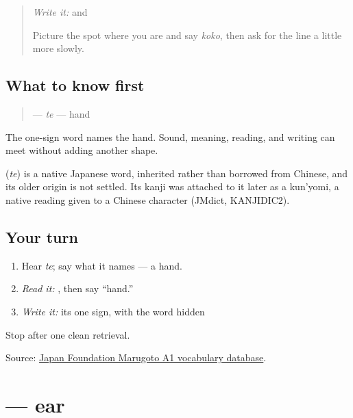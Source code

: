 \label{lesson:JA-C11-te-hand}



\begin{quote}
\emph{Write it:} \textbf{} and \textbf{}

Picture the spot where you are and say \emph{koko}, then ask for the line a little more slowly.
\end{quote}

\subsection*{What to know first}
\begin{quote}
\textbf{} — \emph{te} — hand
\end{quote}

The one-sign word names the hand. Sound, meaning, reading, and writing can meet without adding another shape.

\begin{cousinweb}
\textbf{} (\emph{te}) is a native Japanese word, inherited rather than borrowed from Chinese, and its older origin is not settled. Its kanji was attached to it later as a kun'yomi, a native reading given to a Chinese character (JMdict, KANJIDIC2).
\end{cousinweb}

\subsection*{Your turn}
\begin{enumerate}
\raggedright
  \item Hear \emph{te}; say what it names — a hand.
  \item \emph{Read it:} \textbf{}, then say “hand.”
  \item \emph{Write it:} its one sign, with the word hidden
\end{enumerate}

\begin{tcolorbox}[breakable,colback=teal!4,colframe=teal!35!black,title={Before you move on}]
Stop after one clean retrieval.

Source: \href{https://words.marugotoweb.jp/}{Japan Foundation Marugoto A1 vocabulary database}.
\end{tcolorbox}
\section[\texorpdfstring{\ja{みみ} (mimi)}{みみ (mimi)}]{ — ear}

